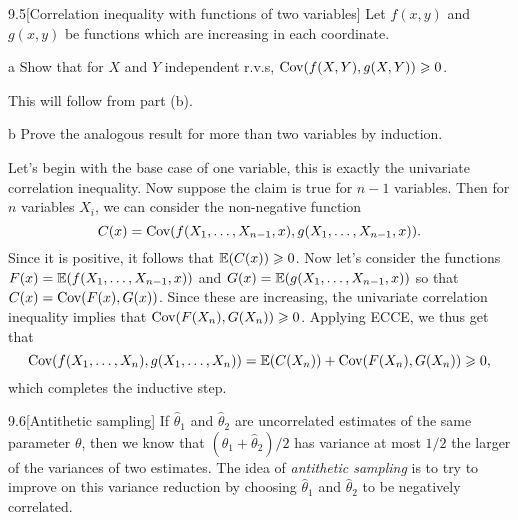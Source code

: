 \documentclass{pset}
\begin{document}
\begin{problem}{9.5}[Correlation inequality with functions of two variables]
  Let $f(x,y)$ and $g(x,y)$ be functions which are increasing in each coordinate.
\end{problem}

\begin{parts}
  \begin{part}{a}
    Show that for $X$ and $Y$ independent r.v.s, $\textrm{Cov}(f(X,Y), g(X,Y)) \geqslant 0$.
  \end{part}

  This will follow from part (b).

  \begin{part}{b}
    Prove the analogous result for more than two variables by induction. %
  \end{part}

  Let's begin with the base case of one variable, this is exactly the univariate correlation inequality. Now suppose the claim is true for $n-1$ variables. Then for $n$ variables $X_i$, we can consider the non-negative function
  \[
    C(x) = \textrm{Cov}(f(X_1, \ldots, X_{n-1}, x), g(X_1,\ldots, X_{n-1}, x)).
  \]
  Since it is positive, it follows that $\mathbb{E}(C(x)) \geqslant 0$. Now let's consider the functions $F(x) = \mathbb{E}(f(X_1,\ldots, X_{n-1}, x))$ and $G(x) = \mathbb{E}(g(X_1,\ldots, X_{n-1}, x))$ so that $C(x) = \textrm{Cov}(F(x), G(x))$. Since these are increasing, the univariate correlation inequality implies that $\textrm{Cov}(F(X_n), G(X_n))\geqslant 0$. Applying ECCE, we thus get that
  \[
    \textrm{Cov}(f(X_1, \ldots, X_n), g(X_1,\ldots, X_n)) = \mathbb{E}(C(X_n)) + \textrm{Cov}(F(X_n), G(X_n)) \geqslant 0,
  \]
  which completes the inductive step.
\end{parts}

\begin{problem}{9.6}[Antithetic sampling]
If $\widehat{\theta}_1$ and $\widehat{\theta}_2$ are uncorrelated estimates of the same parameter $\theta$, then we know that $(\widehat{\theta}_1+ \widehat{\theta}_2)/2$ has variance at most $1/2$ the larger of the variances of two estimates. The idea of \emph{antithetic sampling} is to try to improve on this variance reduction by choosing $\widehat{\theta}_1$ and $\widehat{\theta}_2$ to be negatively correlated.
\end{problem}
\end{document}

